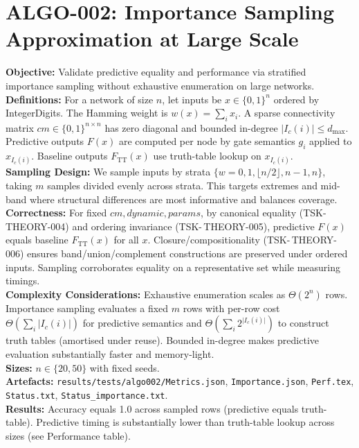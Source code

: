 \documentclass{article}
\begin{document}
\section{ALGO-002: Importance Sampling Approximation at Large Scale}
\textbf{Objective:} Validate predictive equality and performance via stratified importance sampling without exhaustive enumeration on large networks.\\
\textbf{Definitions:} For a network of size \(n\), let inputs be \(x\in\{0,1\}^n\) ordered by IntegerDigits. The Hamming weight is \(w(x)=\sum_i x_i\). A sparse connectivity matrix \(cm\in\{0,1\}^{n\times n}\) has zero diagonal and bounded in-degree \(\lvert I_c(i)\rvert\le d_{\max}\). Predictive outputs \(F(x)\) are computed per node by gate semantics \(g_i\) applied to \(x_{I_c(i)}\). Baseline outputs \(F_\mathrm{TT}(x)\) use truth-table lookup on \(x_{I_c(i)}\).\\
\textbf{Sampling Design:} We sample inputs by strata \(\{w=0,1,\lfloor n/2\rfloor,n-1,n\}\), taking \(m\) samples divided evenly across strata. This targets extremes and mid-band where structural differences are most informative and balances coverage.\\
\textbf{Correctness:} For fixed \(cm, dynamic, params\), by canonical equality (TSK-\,THEORY-004) and ordering invariance (TSK-\,THEORY-005), predictive \(F(x)\) equals baseline \(F_\mathrm{TT}(x)\) for all \(x\). Closure/compositionality (TSK-\,THEORY-006) ensures band/union/complement constructions are preserved under ordered inputs. Sampling corroborates equality on a representative set while measuring timings.\\
\textbf{Complexity Considerations:} Exhaustive enumeration scales as \(\Theta(2^n)\) rows. Importance sampling evaluates a fixed \(m\) rows with per-row cost \(\Theta(\sum_i \lvert I_c(i)\rvert)\) for predictive semantics and \(\Theta(\sum_i 2^{\lvert I_c(i)\rvert})\) to construct truth tables (amortised under reuse). Bounded in-degree makes predictive evaluation substantially faster and memory-light.\\
\textbf{Sizes:} \(n\in\{20,50\}\) with fixed seeds.\\
\textbf{Artefacts:} \texttt{results/tests/algo002/Metrics.json}, \texttt{Importance.json}, \texttt{Perf.tex}, \texttt{Status.txt}, \texttt{Status\_importance.txt}.\\
\textbf{Results:} Accuracy equals 1.0 across sampled rows (predictive equals truth-table). Predictive timing is substantially lower than truth-table lookup across sizes (see Performance table).\\
\end{document}
